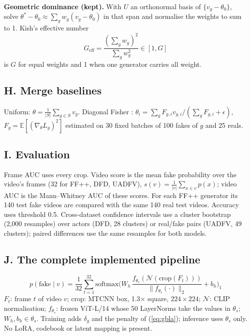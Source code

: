 \documentclass[10pt,a4paper]{article}
\begin{document}
\textbf{Geometric dominance (kept).} With \(U\) an orthonormal basis of \(\{v_g-\theta_0\}\), solve
\(\theta^*-\theta_0\approx\sum_g w_g(v_g-\theta_0)\) in that span and normalise the weights to sum to 1.
Kish's effective number \cite{kish1965}
\begin{equation}
G_\text{eff}=\frac{(\sum_g w_g)^2}{\sum_g w_g^2}\in[1,G]
\end{equation}
is \(G\) for equal weights and 1 when one generator carries all weight.

\subsection{H. Merge baselines}
Uniform: \(\theta=\frac{1}{|S|}\sum_{g\in S}v_g\). Diagonal Fisher \cite{matena2022fisher}:
\(\theta_i=\sum_g F_{g,i}v_{g,i}/(\sum_g F_{g,i}+\epsilon)\), \(F_{g}=\mathbb{E}[(\nabla_\theta L_g)^2]\) estimated
on 30 fixed batches of 100 fakes of \(g\) and 25 reals.

\subsection{I. Evaluation}
Frame AUC uses every crop. Video score is the mean fake probability over the video's frames
(32 for FF++, DFD, UADFV), \(s(v)=\frac{1}{|v|}\sum_{x\in v}p(x)\); video AUC is the Mann--Whitney AUC of
these scores. For each FF++ generator its 140 test fake videos are compared with the same 140 real
test videos. Accuracy uses threshold 0.5. Cross-dataset confidence intervals use a cluster bootstrap
(2,000 resamples) over actors (DFD, 28 clusters) or real/fake pairs (UADFV, 49 clusters); paired
differences use the same resamples for both models.

\subsection{J. The complete implemented pipeline}\label{sec:unified}
\begin{equation}\label{eq:unified}
\boxed{\;
p(\text{fake}\mid v)=\frac{1}{32}\sum_{t=1}^{32}
\mathrm{softmax}\Big(W_h\,\frac{f_{\theta_s}(\mathcal{N}(\mathrm{crop}(F_t)))}{\|f_{\theta_s}(\cdot)\|_2}+b_h\Big)_1\;}
\end{equation}
\(F_t\): frame \(t\) of video \(v\); \(\mathrm{crop}\): MTCNN box, 1.3\(\times\) square, \(224\times224\);
\(\mathcal{N}\): CLIP normalisation; \(f_{\theta_s}\): frozen ViT-L/14 whose 50 LayerNorms take the
values in \(\theta_s\); \(W_h,b_h\in\theta_s\). Training adds \(\delta_g\) and the penalty of
(\ref{eq:gbla}); inference uses \(\theta_s\) only. No LoRA, codebook or latent mapping is present.
\end{document}
